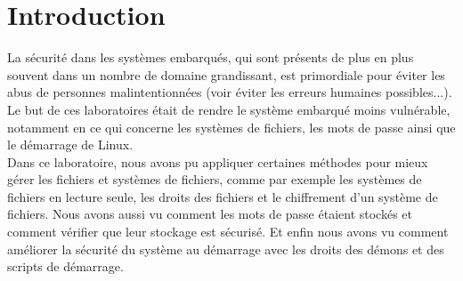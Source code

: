 
\chapter{Introduction} %

\label{Chapitre 1} %


La sécurité dans les systèmes embarqués, qui sont présents de plus en plus souvent dans un nombre de domaine grandissant, est primordiale pour éviter les abus de personnes malintentionnées (voir éviter les erreurs humaines possibles...). \\

Le but de ces laboratoires était de rendre le système embarqué moins vulnérable, notamment en ce qui concerne les systèmes de fichiers, les mots de passe ainsi que le démarrage de Linux. \\ 

Dans ce laboratoire, nous avons pu appliquer certaines méthodes pour mieux gérer les fichiers et systèmes de fichiers, comme par exemple les systèmes de fichiers en lecture seule, les droits des fichiers et le chiffrement d'un système de fichiers. Nous avons aussi vu comment les mots de passe étaient stockés et comment vérifier que leur stockage est sécurisé. Et enfin nous avons vu comment améliorer la sécurité du système au démarrage avec les droits des démons et des scripts de démarrage.\\


























